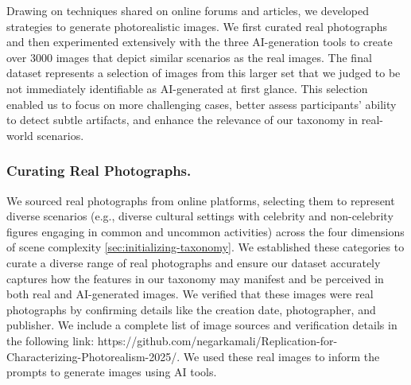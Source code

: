 Drawing on techniques shared on online forums and articles, we developed strategies to generate photorealistic images. We first curated real photographs and then experimented extensively with the three AI-generation tools to create over 3000 images that depict similar scenarios as the real images. The final dataset represents a selection of images from this larger set that we judged to be not immediately identifiable as AI-generated at first glance. This selection enabled us to focus on more challenging cases, better assess participants' ability to detect subtle artifacts, and enhance the relevance of our taxonomy in real-world scenarios. 

\subsubsection{Curating Real Photographs.}  
We sourced real photographs from online platforms, selecting them to represent diverse scenarios (e.g., diverse cultural settings with celebrity and non-celebrity figures engaging in common and uncommon activities) across the four dimensions of scene complexity \autoref{sec:initializing-taxonomy}. We established these categories to curate a diverse range of real photographs and ensure our dataset accurately captures how the features in our taxonomy may manifest and be perceived in both real and AI-generated images. 
We verified that these images were real photographs by confirming details like the creation date, photographer, and publisher. We include a complete list of image sources and verification details in the following link: https://github.com/negarkamali/Replication-for-Characterizing-Photorealism-2025/. We used these real images to inform the prompts to generate images using AI tools.



